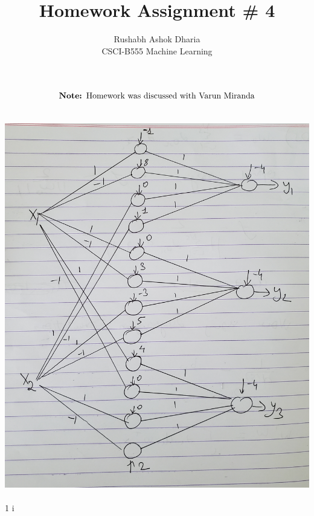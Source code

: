 \documentclass[12pt]{article}
\newenvironment{theorem}[2][Theorem]{\begin{trivlist}
\item[\hskip \labelsep {\bfseries #1}\hskip \labelsep {\bfseries #2.}]}{\end{trivlist}}
\begin{document}
 
 
 
\title{Homework Assignment # 4}
\author{Rushabh Ashok Dharia\\ 
CSCI-B555 Machine Learning} 
\maketitle
\begin{multline*}
    \text{\textbf{Note: }Homework was discussed with Varun Miranda}
\end{multline*} 
\begin{theorem}[Ans]{1}
\\
\includegraphics[scale=0.1]{q1}\\
\\
 1 \leq i  \\

\end{theorem}
\end{document}
